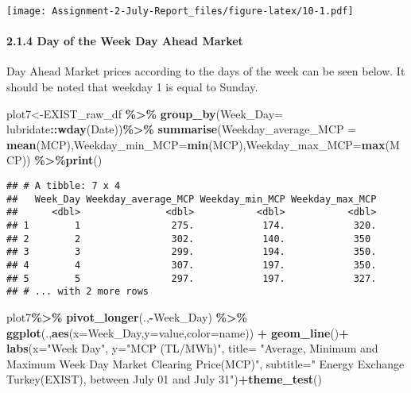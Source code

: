 \documentclass[
]{article}
\newenvironment{Shaded}{\begin{snugshade}}{\end{snugshade}}
\newcommand{\DataTypeTok}[1]{\textcolor[rgb]{0.13,0.29,0.53}{#1}}
\newcommand{\KeywordTok}[1]{\textcolor[rgb]{0.13,0.29,0.53}{\textbf{#1}}}
\newcommand{\NormalTok}[1]{#1}
\newcommand{\OperatorTok}[1]{\textcolor[rgb]{0.81,0.36,0.00}{\textbf{#1}}}
\newcommand{\StringTok}[1]{\textcolor[rgb]{0.31,0.60,0.02}{#1}}
\begin{document}
\texttt{[image: Assignment-2-July-Report\_files/figure-latex/10-1.pdf]}

\hypertarget{day-of-the-week-day-ahead-market}{%
\paragraph{2.1.4 Day of the Week Day Ahead
Market}\label{day-of-the-week-day-ahead-market}}

Day Ahead Market prices according to the days of the week can be seen
below. It should be noted that weekday 1 is equal to Sunday.

\begin{Shaded}
\begin{Highlighting}[]
\NormalTok{plot7\textless{}{-}EXIST\_raw\_df }\OperatorTok{\%\textgreater{}\%}\StringTok{ }\KeywordTok{group\_by}\NormalTok{(}\DataTypeTok{Week\_Day=}\NormalTok{ lubridate}\OperatorTok{::}\KeywordTok{wday}\NormalTok{(Date))}\OperatorTok{\%\textgreater{}\%}\StringTok{ }\KeywordTok{summarise}\NormalTok{(}\DataTypeTok{Weekday\_average\_MCP =} \KeywordTok{mean}\NormalTok{(MCP),}\DataTypeTok{Weekday\_min\_MCP=}\KeywordTok{min}\NormalTok{(MCP),}\DataTypeTok{Weekday\_max\_MCP=}\KeywordTok{max}\NormalTok{(MCP)) }\OperatorTok{\%\textgreater{}\%}\KeywordTok{print}\NormalTok{()}
\end{Highlighting}
\end{Shaded}

\begin{verbatim}
## # A tibble: 7 x 4
##   Week_Day Weekday_average_MCP Weekday_min_MCP Weekday_max_MCP
##      <dbl>               <dbl>           <dbl>           <dbl>
## 1        1                275.            174.            320.
## 2        2                302.            140.            350 
## 3        3                299.            194.            350.
## 4        4                307.            197.            350.
## 5        5                297.            197.            327.
## # ... with 2 more rows
\end{verbatim}

\begin{Shaded}
\begin{Highlighting}[]
\NormalTok{plot7}\OperatorTok{\%\textgreater{}\%}\StringTok{ }\KeywordTok{pivot\_longer}\NormalTok{(.,}\OperatorTok{{-}}\NormalTok{Week\_Day) }\OperatorTok{\%\textgreater{}\%}\StringTok{ }\KeywordTok{ggplot}\NormalTok{(.,}\KeywordTok{aes}\NormalTok{(}\DataTypeTok{x=}\NormalTok{Week\_Day,}\DataTypeTok{y=}\NormalTok{value,}\DataTypeTok{color=}\NormalTok{name)) }\OperatorTok{+}\StringTok{ }\KeywordTok{geom\_line}\NormalTok{()}\OperatorTok{+}
\StringTok{     }\KeywordTok{labs}\NormalTok{(}\DataTypeTok{x=}\StringTok{"Week Day"}\NormalTok{, }\DataTypeTok{y=}\StringTok{"MCP (TL/MWh)"}\NormalTok{, }
           \DataTypeTok{title=}  \StringTok{"Average, Minimum and Maximum Week Day Market Clearing Price(MCP)"}\NormalTok{,}
           \DataTypeTok{subtitle=}\StringTok{" Energy Exchange Turkey(EXIST), between July 01 and July 31"}\NormalTok{)}\OperatorTok{+}\KeywordTok{theme\_test}\NormalTok{()}
\end{Highlighting}
\end{Shaded}
\end{document}
